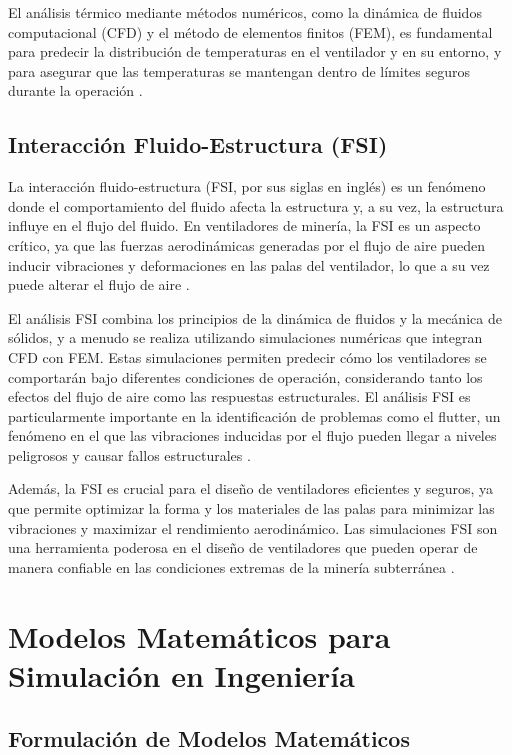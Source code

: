 El análisis térmico mediante métodos numéricos, como la dinámica de fluidos computacional (CFD) y el método de elementos finitos (FEM), es fundamental para predecir la distribución de temperaturas en el ventilador y en su entorno, y para asegurar que las temperaturas se mantengan dentro de límites seguros durante la operación \cite{zienkiewicz2005finite}.

\subsection{Interacción Fluido-Estructura (FSI)}

La interacción fluido-estructura (FSI, por sus siglas en inglés) es un fenómeno donde el comportamiento del fluido afecta la estructura y, a su vez, la estructura influye en el flujo del fluido. En ventiladores de minería, la FSI es un aspecto crítico, ya que las fuerzas aerodinámicas generadas por el flujo de aire pueden inducir vibraciones y deformaciones en las palas del ventilador, lo que a su vez puede alterar el flujo de aire \cite{bathe1996finite}.

El análisis FSI combina los principios de la dinámica de fluidos y la mecánica de sólidos, y a menudo se realiza utilizando simulaciones numéricas que integran CFD con FEM. Estas simulaciones permiten predecir cómo los ventiladores se comportarán bajo diferentes condiciones de operación, considerando tanto los efectos del flujo de aire como las respuestas estructurales. El análisis FSI es particularmente importante en la identificación de problemas como el flutter, un fenómeno en el que las vibraciones inducidas por el flujo pueden llegar a niveles peligrosos y causar fallos estructurales \cite{bazilevs2013computational}.

Además, la FSI es crucial para el diseño de ventiladores eficientes y seguros, ya que permite optimizar la forma y los materiales de las palas para minimizar las vibraciones y maximizar el rendimiento aerodinámico. Las simulaciones FSI son una herramienta poderosa en el diseño de ventiladores que pueden operar de manera confiable en las condiciones extremas de la minería subterránea \cite{ferziger2012computational}.
\section{Modelos Matemáticos para Simulación en Ingeniería}

\subsection{Formulación de Modelos Matemáticos}

